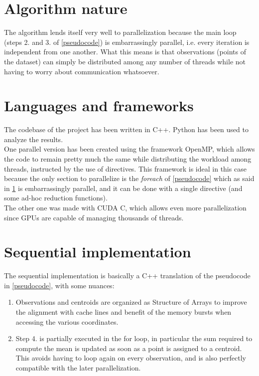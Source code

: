 \documentclass[10pt,twocolumn,letterpaper]{article}
\begin{document}
\section{Algorithm nature} \label{nature}
The algorithm lends itself very well to parallelization because the main loop (steps 2. and 3. of \cref{pseudocode}) is embarrassingly parallel, i.e. every iteration is independent from one another. What this means is that observations (points of the dataset) can simply be distributed among any number of threads while not having to worry about communication whatsoever.

\section{Languages and frameworks}
The codebase of the project has been written in C++. Python has been used to analyze the results.\\
One parallel version has been created using the framework OpenMP, which allows the code to remain pretty much the same while distributing the workload among threads, instructed by the use of directives. This framework is ideal in this case because the only section to parallelize is the \textit{foreach} of \cref{pseudocode} which as said in \cref{nature} is embarrassingly parallel, and it can be done with a single directive (and some ad-hoc reduction functions).\\
The other one was made with CUDA C, which allows even more parallelization since GPUs are capable of managing thousands of threads.

\section{Sequential implementation} \label{seq_imp}
The sequential implementation is basically a C++ translation of the pseudocode in \cref{pseudocode}, with some nuances: 
\begin{enumerate}
	\item Observations and centroids are organized as Structure of Arrays to improve the alignment with cache lines and benefit of the memory bursts when accessing the various coordinates.
	\item Step 4. is partially executed in the for loop, in particular the sum required to compute the mean is updated as soon as a point is assigned to a centroid. This avoids having to loop again on every observation, and is also perfectly compatible with the later parallelization.
\end{enumerate}
\end{document}
